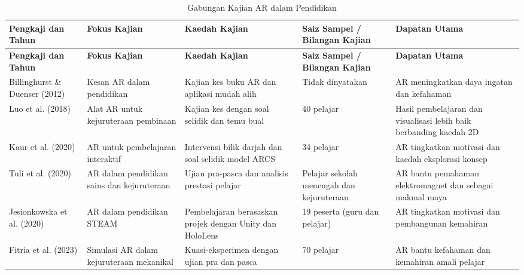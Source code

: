 \documentclass{article}
\begin{document}
\begin{landscape}

\begin{longtable}{|p{4.5cm}|p{4.5cm}|p{5cm}|p{4cm}|p{6cm}|}
\caption{Gabungan Kajian AR dalam Pendidikan} \label{tab:kajian_ar} \\
\hline
\textbf{Pengkaji dan Tahun} & \textbf{Fokus Kajian} & \textbf{Kaedah Kajian} & \textbf{Saiz Sampel / Bilangan Kajian} & \textbf{Dapatan Utama} \\
\hline
\endfirsthead
\hline
\textbf{Pengkaji dan Tahun} & \textbf{Fokus Kajian} & \textbf{Kaedah Kajian} & \textbf{Saiz Sampel / Bilangan Kajian} & \textbf{Dapatan Utama} \\
\hline
\endhead
Billinghurst \& Duenser (2012) & Kesan AR dalam pendidikan & Kajian kes buku AR dan aplikasi mudah alih & Tidak dinyatakan & AR meningkatkan daya ingatan dan kefahaman \\
\hline
Luo et al. (2018) & Alat AR untuk kejuruteraan pembinaan & Kajian kes dengan soal selidik dan temu bual & 40 pelajar & Hasil pembelajaran dan visualisasi lebih baik berbanding kaedah 2D \\
\hline
Kaur et al. (2020) & AR untuk pembelajaran interaktif & Intervensi bilik darjah dan soal selidik model ARCS & 34 pelajar & AR tingkatkan motivasi dan kaedah eksplorasi konsep \\
\hline
Tuli et al. (2020) & AR dalam pendidikan sains dan kejuruteraan & Ujian pra-pasca dan analisis prestasi pelajar & Pelajar sekolah menengah dan kejuruteraan & AR bantu pemahaman elektromagnet dan sebagai makmal maya \\
\hline
Jesionkowska et al. (2020) & AR dalam pendidikan STEAM & Pembelajaran berasaskan projek dengan Unity dan HoloLens & 19 peserta (guru dan pelajar) & AR tingkatkan motivasi dan pembangunan kemahiran \\
\hline
Fitria et al. (2023) & Simulasi AR dalam kejuruteraan mekanikal & Kuasi-eksperimen dengan ujian pra dan pasca & 70 pelajar & AR bantu kefahaman dan kemahiran amali pelajar \\
\hline
\end{longtable}

\end{landscape}
\end{document}
